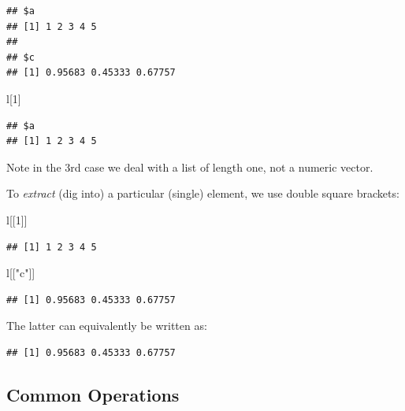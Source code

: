\documentclass[10pt,b5paper,krantz1]{krantz}
\newenvironment{Shaded}{\begin{snugshade}}{\end{snugshade}}
\newcommand{\DecValTok}[1]{\textcolor[rgb]{0.06,0.06,0.06}{#1}}
\newcommand{\NormalTok}[1]{#1}
\newcommand{\OperatorTok}[1]{\textcolor[rgb]{0.43,0.43,0.43}{\textbf{#1}}}
\newcommand{\StringTok}[1]{\textcolor[rgb]{0.5,0.5,0.5}{#1}}
\begin{document}
\begin{verbatim}
## $a
## [1] 1 2 3 4 5
## 
## $c
## [1] 0.95683 0.45333 0.67757
\end{verbatim}

\begin{Shaded}
\begin{Highlighting}[]
\NormalTok{l[}\DecValTok{1}\NormalTok{]}
\end{Highlighting}
\end{Shaded}

\begin{verbatim}
## $a
## [1] 1 2 3 4 5
\end{verbatim}

Note in the 3rd case we deal with a list of length one, not a numeric vector.

To \emph{extract} (dig into) a particular (single) element, we use double square brackets:

\begin{Shaded}
\begin{Highlighting}[]
\NormalTok{l[[}\DecValTok{1}\NormalTok{]]}
\end{Highlighting}
\end{Shaded}

\begin{verbatim}
## [1] 1 2 3 4 5
\end{verbatim}

\begin{Shaded}
\begin{Highlighting}[]
\NormalTok{l[[}\StringTok{"c"}\NormalTok{]]}
\end{Highlighting}
\end{Shaded}

\begin{verbatim}
## [1] 0.95683 0.45333 0.67757
\end{verbatim}

The latter can equivalently be written as:

\begin{Shaded}
\end{Shaded}

\begin{verbatim}
## [1] 0.95683 0.45333 0.67757
\end{verbatim}

\hypertarget{common-operations}{%
\subsection{Common Operations}\label{common-operations}}
\end{document}
